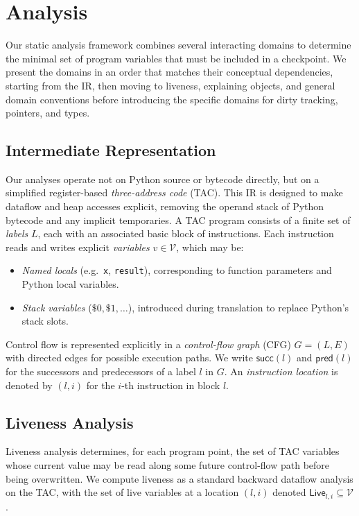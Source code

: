 \section{Analysis}
\label{sec:analysis}

Our static analysis framework combines several interacting domains to determine the minimal set of program variables that must be included in a checkpoint.  
We present the domains in an order that matches their conceptual dependencies, starting from the IR, then moving to liveness, explaining objects, and general domain conventions before introducing the specific domains for dirty tracking, pointers, and types.

\subsection{Intermediate Representation}
Our analyses operate not on Python source or bytecode directly, but on a simplified register-based \emph{three-address code} (TAC).
This IR is designed to make dataflow and heap accesses explicit, removing the operand stack of Python bytecode and any implicit temporaries.
A TAC program consists of a finite set of \emph{labels} $L$, each with an associated basic block of instructions.
Each instruction reads and writes explicit \emph{variables} $v \in \mathcal{V}$, which may be:
\begin{itemize}
    \item \emph{Named locals} (e.g.\ \texttt{x}, \texttt{result}), corresponding to function parameters and Python local variables.
    \item \emph{Stack variables} ($\$0, \$1, \ldots$), introduced during translation to replace Python's stack slots.
\end{itemize}
Control flow is represented explicitly in a \emph{control-flow graph} (CFG) $G = (L, E)$ with directed edges for possible execution paths.
We write $\mathsf{succ}(l)$ and $\mathsf{pred}(l)$ for the successors and predecessors of a label $l$ in $G$.
An \emph{instruction location} is denoted by $(l, i)$ for the $i$-th instruction in block $l$.
\subsection{Liveness Analysis}
Liveness analysis determines, for each program point, the set of TAC variables whose current value may be read along some future control-flow path before being overwritten.  
We compute liveness as a standard backward dataflow analysis on the TAC, with the set of live variables at a location $(l,i)$ denoted $\mathsf{Live}_{l,i} \subseteq \mathcal{V}$.

